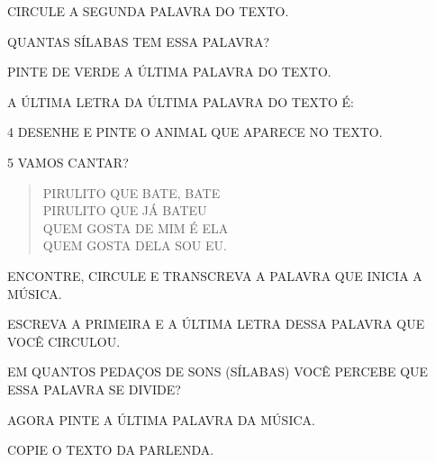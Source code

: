 \begin{escolha}
\item CIRCULE A SEGUNDA PALAVRA DO TEXTO.

\item QUANTAS SÍLABAS TEM ESSA PALAVRA?\\

\item PINTE DE VERDE A ÚLTIMA PALAVRA DO TEXTO.

\item A ÚLTIMA LETRA DA ÚLTIMA PALAVRA DO TEXTO É:\\
\end{escolha}

\pagebreak

\num{4} DESENHE E PINTE O ANIMAL QUE APARECE NO TEXTO.

\begin{mdframed}[linewidth=2pt,linecolor=salmao,roundcorner=2pt]
\vspace{20cm}
\end{mdframed}

\pagebreak
\num{5} VAMOS CANTAR?


\begin{myquote}
\begin{verse}
PIRULITO QUE BATE, BATE\\
PIRULITO QUE JÁ BATEU\\
QUEM GOSTA DE MIM É ELA\\
QUEM GOSTA DELA SOU EU.
\end{verse}
\end{myquote}

\begin{escolha}
\item ENCONTRE, CIRCULE E TRANSCREVA A PALAVRA QUE INICIA A MÚSICA.\\

\item ESCREVA A PRIMEIRA E A ÚLTIMA LETRA DESSA PALAVRA QUE VOCÊ CIRCULOU.\\

\item EM QUANTOS PEDAÇOS DE SONS (SÍLABAS) VOCÊ PERCEBE QUE ESSA PALAVRA SE DIVIDE?\\

\item AGORA PINTE A ÚLTIMA PALAVRA DA MÚSICA.\\

\item COPIE O TEXTO DA PARLENDA.\\ \enlargethispage{2\baselineskip}
\end{escolha}

